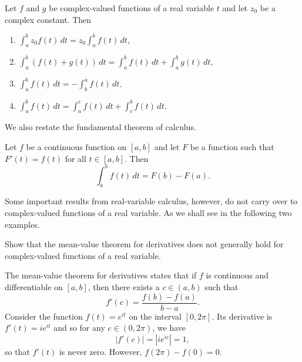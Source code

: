 \begin{theorem}
    Let \(f\) and \(g\) be complex-valued functions of a real variable \(t\) and let \(z_0\) be a complex constant. Then
    \begin{enumerate}[label=(\alph*)]
        \item \(\displaystyle \int_a^b z_0 f(t) \, dt = z_0 \int_a^b f(t) \, dt\),
        \item \(\displaystyle \int_a^b \left( f(t) + g(t) \right) \, dt = \int_a^b f(t) \, dt + \int_a^b g(t) \, dt\),
        \item \(\displaystyle \int_a^b f(t) \, dt = -\int_b^a f(t) \, dt\).
        \item \(\displaystyle \int_a^b f(t) \, dt = \int_a^c f(t) \, dt + \int_c^b f(t) \, dt\).
    \end{enumerate}
\end{theorem}

We also restate the fundamental theorem of calculus.

\begin{theorem}
    \label{thm:fundamental-theorem-calculus-real-variable}
    Let \(f\) be a continuous function on \([a, b]\) and let \(F\) be a function such that \(F'(t) = f(t)\) for all \(t \in [a, b]\). Then
    \begin{equation}
        \int_a^b f(t) \, dt = F(b) - F(a).
        \label{eq:fundamental-theorem-calculus-real-variable}
    \end{equation}
\end{theorem}

Some important results from real-variable calculus, however, do not carry over to complex-valued functions of a real variable. As we shall see in the following two examples.

\begin{example}
    Show that the mean-value theorem for derivatives does not generally hold for complex-valued functions of a real variable.

    \begin{solution}
        The mean-value theorem for derivatives states that if \(f\) is continuous and differentiable on \([a, b]\), then there exists a \(c \in (a, b)\) such that
        \[
            f'(c) = \frac{f(b) - f(a)}{b-a}.
        \]
        Consider the function \(f(t) = e^{it}\) on the interval \([0, 2\pi]\). Its derivative is \(f'(t) = ie^{it}\) and so for any \(c \in (0, 2\pi)\), we have
        \[
            |f'(c)| = |ie^{ic}| = 1,
        \]
        so that \(f'(t)\) is never zero. However, \(f(2\pi) - f(0) = 0\).
    \end{solution}
\end{example}

